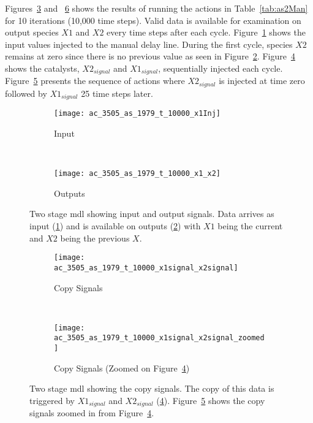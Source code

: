 Figures~\ref{fig:delay2allMan_A} and ~\ref{fig:delay2allMan_B} shows the results of running the actions in Table~\ref{tab:as2Man} for 10 iterations (10,000 time steps). Valid data is available for examination on output species $X1$ and $X2$ every time steps after each cycle. Figure~\ref{fig:delay2XMan} shows the input values injected to the manual delay line. During the first cycle, species $X2$ remains at zero since there is no previous value as seen in Figure~\ref{fig:delay2X1Man}. Figure~\ref{fig:delay2X2SignalMan} shows the catalysts, $X2_{signal}$ and $X1_{signal}$, sequentially injected each cycle. Figure~\ref{fig:delay2X2SignalZoomedMan} presents the sequence of actions where $X2_{signal}$ is injected at time zero followed by $X1_{signal}$ 25 time steps later.

\begin{figure}[ht]
	\centering
	\begin{subfigure}[b]{0.9\textwidth}
	    \centering
		\texttt{[image: ac\_3505\_as\_1979\_t\_10000\_x1Inj]}
		\caption{Input}
		\label{fig:delay2XMan}
		\vspace{15mm}
	\end{subfigure}
	\\
	\begin{subfigure}[b]{0.9\textwidth}
	    \centering
		\texttt{[image: ac\_3505\_as\_1979\_t\_10000\_x1\_x2]}
		\caption{Outputs}
		\label{fig:delay2X1Man}
	\end{subfigure}
	\caption[Two Stage Manual Copy Delay Line I/O]{Two stage \gls{mdl} showing input and output signals. Data arrives as input (\ref{fig:delay2XMan}) and is available on outputs (\ref{fig:delay2X1Man}) with $X1$ being the current and $X2$ being the previous $X$.}
	\label{fig:delay2allMan_A}
\end{figure}

\begin{figure}[ht]
    \centering
	\begin{subfigure}[b]{0.9\textwidth}
	    \centering
		\texttt{[image: ac\_3505\_as\_1979\_t\_10000\_x1signal\_x2signal]}
		\caption{Copy Signals}
		\label{fig:delay2X2SignalMan}
		\vspace{15mm}
	\end{subfigure}
	\\
	\begin{subfigure}[b]{0.9\textwidth}
	    \centering
		\texttt{[image: ac\_3505\_as\_1979\_t\_10000\_x1signal\_x2signal\_zoomed]}
		\caption{Copy Signals (Zoomed on Figure~\ref{fig:delay2X2SignalMan})}
		\label{fig:delay2X2SignalZoomedMan}
	\end{subfigure}
	\caption[Two Stage Manual Copy Delay Line Signaling]{Two stage \gls{mdl} showing the copy signals. The copy of this data is triggered by $X1_{signal}$ and $X2_{signal}$ (\ref{fig:delay2X2SignalMan}). Figure~\ref{fig:delay2X2SignalZoomedMan} shows the copy signals zoomed in from Figure~\ref{fig:delay2X2SignalMan}.}
	\label{fig:delay2allMan_B}
\end{figure}

